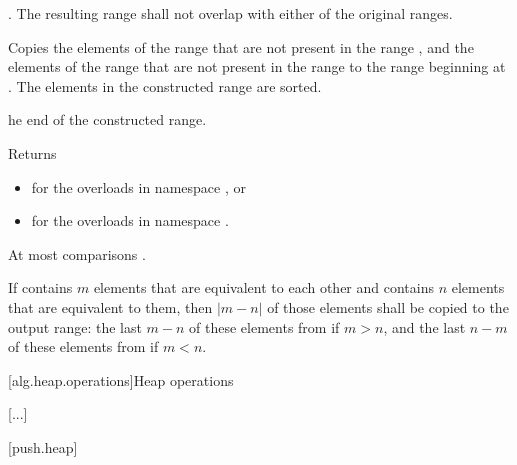 \begin{itemdescr}
\pnum
\requires
{}.
The resulting range shall not overlap with either of the original ranges.

\pnum
\effects
Copies the elements of the range
that are not present in the range
,
and the elements of the range
that are not present in the range
to the range beginning at
.
The elements in the constructed range are sorted.

\pnum
\returns
{}he end of the
constructed range.
\begin{addedblock}
Returns
\begin{itemize}
\item {} for the overloads in namespace , or
\item {} for the overloads in
  namespace .
\end{itemize}
\end{addedblock}

\pnum
\complexity
At most
comparisons .

\pnum
\remarks
If  contains $m$ elements that are equivalent to each other and
 contains $n$ elements that are equivalent to them, then
$|m - n|$ of those elements shall be copied to the output range: the last
$m - n$ of these elements from  if $m > n$, and the last
$n - m$ of these elements from  if $m < n$.
\end{itemdescr}


[alg.heap.operations]{Heap operations}

[...]

[push.heap]{}

